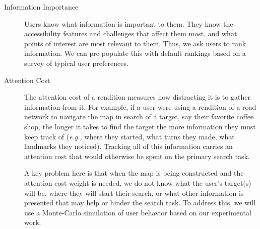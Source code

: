 \begin{description}
\item[Information Importance]
Users know what information is important to them. They know the accessibility features and challenges that affect them most, and what points of interest are most relevant to them. %
Thus, we ask users to rank information. %
We can pre-populate this with default rankings based on a survey of typical user preferences. 

\item[Attention Cost]
The attention cost of a rendition measures how distracting it is to gather information from it. For example, if a user were using a rendition of a road network to navigate the map in search of a target, say their favorite coffee shop,  the longer it takes to find the target the more information they must keep track of (\textit{e.g.,} where they started, what turns they made, what landmarks they noticed). Tracking all of this information carries an attention cost that would otherwise be spent on the primary search task.

A key problem here is that when the map is being constructed and the attention cost weight is needed, we do not know what the user's target(s) will be, where they will start their search, or what other information is presented that may help or hinder the search task. To address this, we will use a Monte-Carlo simulation of user behavior based on our experimental work. %


\end{description}
